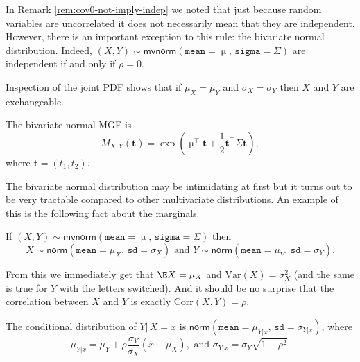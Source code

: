\documentclass[captions=tableheading]{scrbook}
\begin{document}
\begin{rem}
In Remark \ref{rem:cov0-not-imply-indep} we noted that just because random variables are uncorrelated it does not necessarily mean that they are independent. However, there is an important exception to this rule: the bivariate normal distribution. Indeed, \((X,Y)\sim\mathsf{mvnorm}(\mathtt{mean}=\upmu,\,\mathtt{sigma}=\Sigma)\) are independent if and only if \(\rho=0\). 
\end{rem}

\begin{rem}
Inspection of the joint PDF shows that if \(\mu_{X}=\mu_{Y}\) and \(\sigma_{X}=\sigma_{Y}\) then \(X\) and \(Y\) are exchangeable.
\end{rem}

The bivariate normal MGF is
\begin{equation}
M_{X,Y}(\mathbf{t})=\exp\left(\upmu^{\top}\mathbf{t}+\frac{1}{2}\mathbf{t}^{\top}\Sigma\mathbf{t}\right),
\end{equation}
where \(\mathbf{t}=(t_{1},t_{2})\).

The bivariate normal distribution may be intimidating at first but it turns out to be very tractable compared to other multivariate distributions. An example of this is the following fact about the marginals. 

\begin{fact}
If \((X,Y)\sim\mathsf{mvnorm}(\mathtt{mean}=\upmu,\,\mathtt{sigma}=\Sigma)\) then
\begin{equation}
X\sim\mathsf{norm}(\mathtt{mean}=\mu_{X},\,\mathtt{sd}=\sigma_{X})\mbox{ and }Y\sim\mathsf{norm}(\mathtt{mean}=\mu_{Y},\,\mathtt{sd}=\sigma_{Y}).
\end{equation}
\end{fact}

From this we immediately get that \(\E X=\mu_{X}\) and \(\mbox{Var}(X)=\sigma_{X}^{2}\) (and the same is true for \(Y\) with the letters switched). And it should be no surprise that the correlation between \(X\) and \(Y\) is exactly \(\mbox{Corr}(X,Y)=\rho\).

\begin{prop}
\label{pro:mvnorm-cond-dist}
The conditional distribution of \(Y|\, X=x\) is \(\mathsf{norm}(\mathtt{mean}=\mu_{Y|x},\,\mathtt{sd}=\sigma_{Y|x})\), where
\begin{equation}
\mu_{Y|x}=\mu_{Y}+\rho\frac{\sigma_{Y}}{\sigma_{X}}\left(x-\mu_{X}\right),\mbox{ and }\sigma_{Y|x}=\sigma_{Y}\sqrt{1-\rho^{2}}.
\end{equation}
\end{prop}
\end{document}
